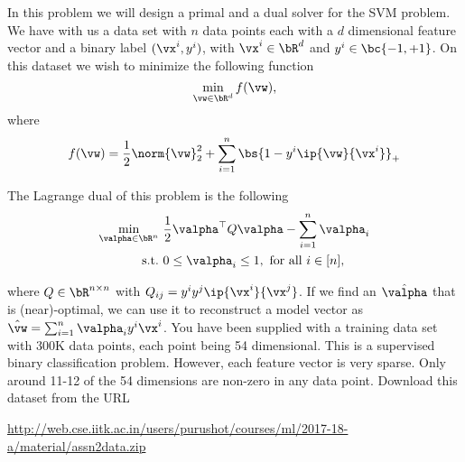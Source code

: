 \documentclass[a4paper,11pt]{article}
\begin{document}
\begin{mlproblem}{40}
In this problem we will design a primal and a dual solver for the SVM problem. We have with us a data set with $n$ data points each with a $d$ dimensional feature vector and a binary label $(\vx^i,y^i)$, with $\vx^i \in \bR^d$ and $y^i \in \bc{-1,+1}$. On this dataset we wish to minimize the following function 
\[
\min_{\vw \in \bR^d} f(\vw),
\]
where
\begin{align*}
f(\vw) = \frac{1}{2}\norm{\vw}_2^2 + \sum_{i=1}^n\bs{1 - y^i\ip{\vw}{\vx^i}}_+
\end{align*}

The Lagrange dual of this problem is the following
\begin{align*}
\min_{\valpha \in \bR^n}&\ \frac{1}{2} \valpha^\top Q \valpha - \sum_{i=1}^n\valpha_i\\
\text{s.t.}&\ 0 \leq \valpha_i \leq 1, \text{ for all } i \in [n],
\end{align*}

where $Q \in \bR^{n \times n}$ with $Q_{ij} = y^iy^j\ip{\vx^i}{\vx^j}$. If we find an $\hat\valpha$ that is (near)-optimal, we can use it to reconstruct a model vector as $\hat\vw = \sum_{i=1}^n\valpha_iy^i\vx^i$. You have been supplied with a training data set with 300K data points, each point being 54 dimensional. This is a supervised binary classification problem. However, each feature vector is very sparse. Only around 11-12 of the 54 dimensions are non-zero in any data point. Download this dataset from the URL

{\small \url{http://web.cse.iitk.ac.in/users/purushot/courses/ml/2017-18-a/material/assn2data.zip}}\\


\end{mlproblem}
\end{document}

